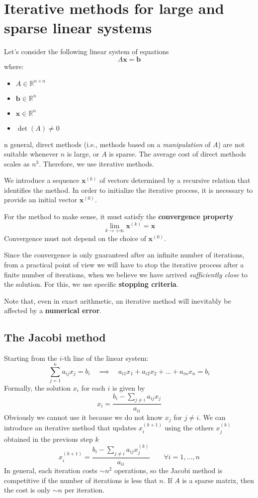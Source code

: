 \section{Iterative methods for large and sparse linear systems}

Let's consider the following linear system of equations
$$A \mathbf{x} = \mathbf{b}$$
where:

\begin{itemize}
    \item $A \in \mathbb{R}^{n \times n}$
    \item $\mathbf{b} \in \mathbb{R}^{n}$
    \item $\mathbf{x} \in \mathbb{R}^{n}$
    \item $\det(A) \neq 0$
\end{itemize}

n general, direct methods (i.e., methods based on a \textit{manipulation} of $A$) are not suitable whenever $n$ is large, or $A$ is sparse. The average cost of direct methods scales as $n^{3}$. Therefore, we use iterative methods.

We introduce a sequence $\mathbf{x}^{(k)}$ of vectors determined by a recursive relation that identifies the method. In order to initialize the iterative process, it is necessary to provide an initial vector $\mathbf{x}^{(0)}$.

For the method to make sense, it must satisfy the \textbf{convergence property}
$$
    \lim_{ k \to +\infty } \mathbf{x}^{(k)} = \mathbf{x}
$$
Convergence must not depend on the choice of $\mathbf{x}^{(0)}$.

Since the convergence is only guaranteed after an infinite number of iterations,
from a practical point of view we will have to stop the iterative process after a finite number of iterations,
when we believe we have arrived \textit{sufficiently close} to the solution.
For this, we use specific \textbf{stopping criteria}.

Note that, even in exact arithmetic, an iterative method will inevitably be affected by a \textbf{numerical error}.

\subsection{The Jacobi method}

Starting from the $i$-th line of the linear system:
$$
    \sum_{j = 1}^{n} a_{ij} x_{j} = b_{i} \quad \implies \quad a_{i 1} x_{1} + a_{i 2} x_{2} + \dots + a_{i n} x_{n} = b_{i}
$$
Formally, the solution $x_{i}$ for each $i$ is given by
$$
    x_{i} = \frac{b_{i} - \sum_{j \neq i} a_{ij} x_{j}}{a_{ii}}
$$
Obviously we cannot use it because we do not know $x_{j}$ for $j \neq i$. We can introduce an iterative method that updates $x_{i}^{(k+1)}$ using the others $x_{j}^{(k)}$ obtained in the previous step $k$
$$
    x_{i}^{(k+1)} = \frac{b_{i} - \sum_{j\neq i} a_{ij} x_{j}^{(k)}}{a_{ii}} \qquad \forall i = 1, \dots, n
$$
In general, each iteration costs $\sim n^{2}$ operations, so the Jacobi method is competitive if the number of iterations is less that $n$. If $A$ is a sparse matrix, then the cost is only $\sim n$ per iteration.

